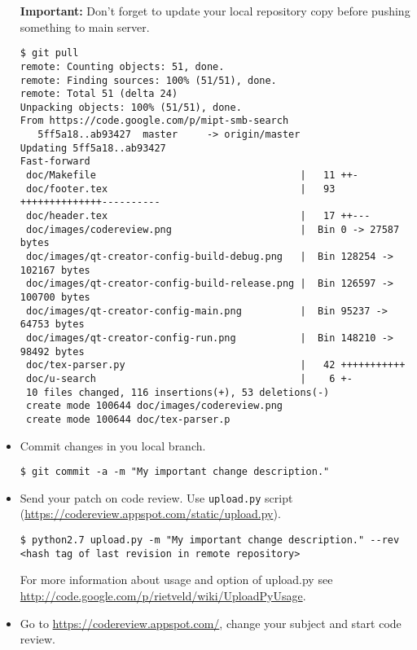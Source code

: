 \begin{itemize}

\textbf{Important:} Don't forget to update your local repository copy before pushing something to main server.

\begin{lstlisting}
$ git pull
remote: Counting objects: 51, done.
remote: Finding sources: 100% (51/51), done.
remote: Total 51 (delta 24)
Unpacking objects: 100% (51/51), done.
From https://code.google.com/p/mipt-smb-search
   5ff5a18..ab93427  master     -> origin/master
Updating 5ff5a18..ab93427
Fast-forward
 doc/Makefile                                   |   11 ++-
 doc/footer.tex                                 |   93 ++++++++++++++----------
 doc/header.tex                                 |   17 ++---
 doc/images/codereview.png                      |  Bin 0 -> 27587 bytes
 doc/images/qt-creator-config-build-debug.png   |  Bin 128254 -> 102167 bytes
 doc/images/qt-creator-config-build-release.png |  Bin 126597 -> 100700 bytes
 doc/images/qt-creator-config-main.png          |  Bin 95237 -> 64753 bytes
 doc/images/qt-creator-config-run.png           |  Bin 148210 -> 98492 bytes
 doc/tex-parser.py                              |   42 +++++++++++
 doc/u-search                                   |    6 +-
 10 files changed, 116 insertions(+), 53 deletions(-)
 create mode 100644 doc/images/codereview.png
 create mode 100644 doc/tex-parser.p
\end{lstlisting}

\item Commit changes in you local branch.

\begin{lstlisting}
$ git commit -a -m "My important change description."
\end{lstlisting}

\item Send your patch on code review. Use \texttt{upload.py} script (\url{https://codereview.appspot.com/static/upload.py}).

\begin{lstlisting}
$ python2.7 upload.py -m "My important change description." --rev <hash tag of last revision in remote repository>
\end{lstlisting}

For more information about usage and option of upload.py see \url{http://code.google.com/p/rietveld/wiki/UploadPyUsage}.

\item Go to \url{https://codereview.appspot.com/}, change your subject and start code review.


\end{itemize}
